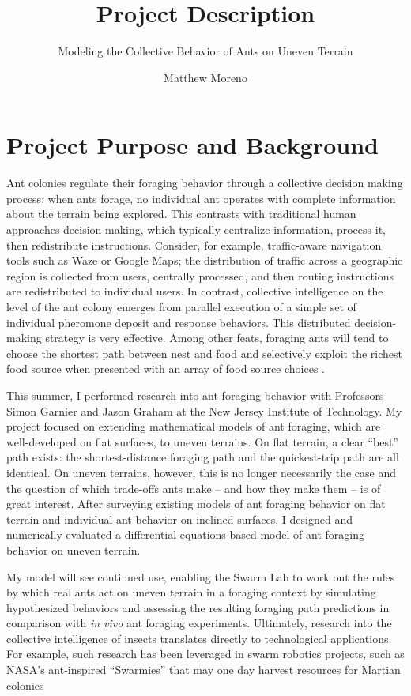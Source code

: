 \documentclass{scrartcl}
\subtitle{Modeling the Collective Behavior of Ants on Uneven Terrain}
\title{Project Description}
\author{Matthew Moreno}
\begin{document}
\maketitle
\section{Project Purpose and Background}
Ant colonies regulate their foraging behavior through a collective decision making process; when ants forage, no individual ant operates with complete information about the terrain being explored. This contrasts with traditional human approaches decision-making, which typically centralize information, process it, then redistribute instructions. Consider, for example, traffic-aware navigation tools such as Waze or Google Maps; the distribution of traffic  across a geographic region is collected from users, centrally processed, and then routing instructions are redistributed to individual users. In contrast, collective intelligence on the level of the ant colony emerges from parallel execution of a simple set of individual pheromone deposit and response behaviors. This distributed decision-making strategy is very effective. Among other feats, foraging ants will tend to choose the shortest path between nest and food and selectively exploit the richest food source when presented with an array of food source choices \cite{camazine_self-organization_2003}.

This summer, I performed research into ant foraging behavior with Professors Simon Garnier and Jason Graham at the New Jersey Institute of Technology. My project focused on extending mathematical models of ant foraging, which are well-developed on flat surfaces, to uneven terrains. On flat terrain, a clear ``best'' path exists: the shortest-distance foraging path and the quickest-trip path are all identical. On uneven terrains, however, this is no longer necessarily the case and the question of which trade-offs ants make -- and how they make them -- is of great interest. After surveying existing models of ant foraging behavior on flat terrain and individual ant behavior on inclined surfaces, I designed and numerically evaluated a differential equations-based model of ant foraging behavior on uneven terrain.

My model will see continued use, enabling the Swarm Lab to work out the rules by which real ants act on uneven terrain in a foraging context by simulating hypothesized behaviors and assessing the resulting foraging path predictions in comparison with \textit{in vivo} ant foraging experiments. Ultimately, research into the collective intelligence of insects translates directly to technological applications. For example, such research has been leveraged in swarm robotics projects, such as NASA's ant-inspired ``Swarmies'' that may one day harvest resources for Martian colonies \cite{falker2015autonomous}
\end{document}
